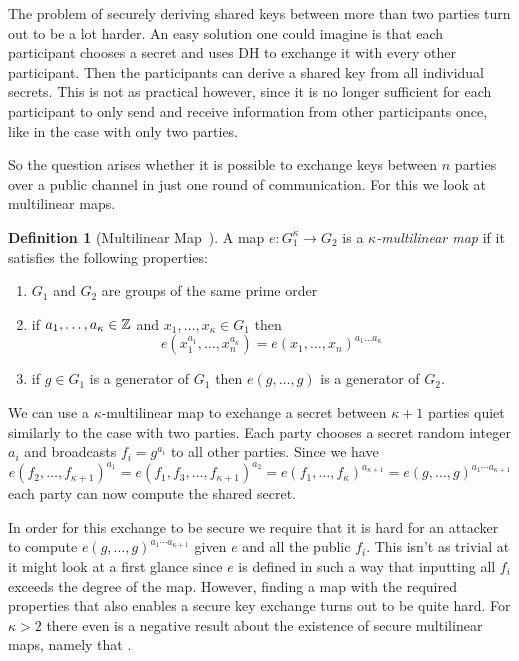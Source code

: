 \documentclass[english]{scrartcl}
\theoremstyle{plain}
\theoremstyle{definition}
\newtheorem{definition}{Definition}
\begin{document}
    The problem of securely deriving shared keys between more than two parties turn out to be a lot harder. An easy solution one could imagine is that each participant chooses a secret and uses DH to exchange it with every other participant. Then the participants can derive a shared key from all individual secrets.
    This is not as practical however, since it is no longer sufficient for each participant to only send and receive information from other participants once, like in the case with only two parties.

    So the question arises whether it is possible to exchange keys between $n$ parties over a public channel in just one round of communication.
    For this we look at multilinear maps.

    \begin{definition}[Multilinear Map~\cite{boneh2003applications}]
        A map $e: G_1^\kappa \rightarrow G_2$ is a \emph{$\kappa$-multilinear map} if it satisfies the following properties:
        \begin{enumerate}
            \item $G_1$ and $G_2$ are groups of the same prime order
            \item if $a_1,\dots ,a_\kappa \in \mathbb{Z}$ and $x_1, \dots, x_\kappa \in G_1$ then
                \begin{equation*}
                    e\left( x_1^{a_1}, \dots, x_n^{a_\kappa} \right) = e(x_1, \dots, x_n)^{a_1\dots a_\kappa}
                \end{equation*}
            \item if $g \in G_1$ is a generator of $G_1$ then $e(g, \dots, g)$ is a generator of $G_2$.
        \end{enumerate}
    \end{definition}
    \noindent
    We can use a $\kappa$-multilinear map to exchange a secret between $\kappa + 1$ parties quiet similarly to the case with two parties. Each party chooses a secret random integer $a_i$ and broadcasts $f_i = g^{a_i}$ to all other parties.
    Since we have
    \begin{equation*}
        e(f_2, \dots, f_{\kappa+1})^{a_1} = e(f_1, f_3, \dots, f_{\kappa+1})^{a_2} = e(f_1, \dots, f_\kappa)^{a_{\kappa+1}} = e(g, \dots, g)^{a_1 \cdots a_{\kappa+1}}
    \end{equation*}
    each party can now compute the shared secret.

    In order for this exchange to be secure we require that it is hard for an attacker to compute $e(g, \dots, g)^{a_1 \cdots a_{\kappa+1}}$ given $e$ and all the public $f_i$. This isn't as trivial at it might look at a first glance since $e$ is defined in such a way that inputting all $f_i$ exceeds the degree of the map.
    However, finding a map with the required properties that also enables a secure key exchange turns out to be quite hard.
    For $\kappa > 2$ there even is a negative result about the existence of secure multilinear maps, namely that .
\end{document}
